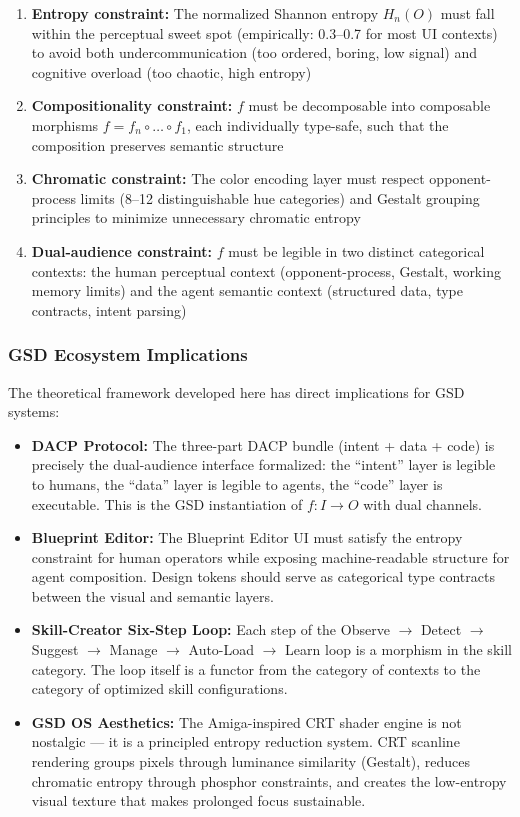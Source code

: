 \documentclass[11pt,letterpaper]{article}
\begin{document}
\begin{enumerate}[leftmargin=2em, itemsep=0.3em]
  \item \textbf{Entropy constraint:} The normalized Shannon entropy $H_n(O)$ must fall within the perceptual sweet spot (empirically: 0.3--0.7 for most UI contexts) to avoid both undercommunication (too ordered, boring, low signal) and cognitive overload (too chaotic, high entropy)
  \item \textbf{Compositionality constraint:} $f$ must be decomposable into composable morphisms $f = f_n \circ \ldots \circ f_1$, each individually type-safe, such that the composition preserves semantic structure
  \item \textbf{Chromatic constraint:} The color encoding layer must respect opponent-process limits (8--12 distinguishable hue categories) and Gestalt grouping principles to minimize unnecessary chromatic entropy
  \item \textbf{Dual-audience constraint:} $f$ must be legible in two distinct categorical contexts: the human perceptual context (opponent-process, Gestalt, working memory limits) and the agent semantic context (structured data, type contracts, intent parsing)
\end{enumerate}

\subsubsection{GSD Ecosystem Implications}

The theoretical framework developed here has direct implications for GSD systems:

\begin{itemize}[itemsep=0.3em]
  \item \textbf{DACP Protocol:} The three-part DACP bundle (intent + data + code) is precisely the dual-audience interface formalized: the ``intent'' layer is legible to humans, the ``data'' layer is legible to agents, the ``code'' layer is executable. This is the GSD instantiation of $f: I \to O$ with dual channels.
  \item \textbf{Blueprint Editor:} The Blueprint Editor UI must satisfy the entropy constraint for human operators while exposing machine-readable structure for agent composition. Design tokens should serve as categorical type contracts between the visual and semantic layers.
  \item \textbf{Skill-Creator Six-Step Loop:} Each step of the Observe $\to$ Detect $\to$ Suggest $\to$ Manage $\to$ Auto-Load $\to$ Learn loop is a morphism in the skill category. The loop itself is a functor from the category of contexts to the category of optimized skill configurations.
  \item \textbf{GSD OS Aesthetics:} The Amiga-inspired CRT shader engine is not nostalgic --- it is a principled entropy reduction system. CRT scanline rendering groups pixels through luminance similarity (Gestalt), reduces chromatic entropy through phosphor constraints, and creates the low-entropy visual texture that makes prolonged focus sustainable.
\end{itemize}
\end{document}
